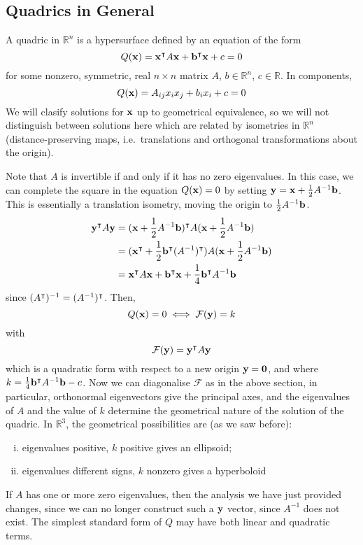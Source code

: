 \subsection{Quadrics in General}
A quadric in \(\mathbb R^n\) is a hypersurface defined by an equation of the form
\[
	Q(\vb x) = \vb x^\intercal A \vb x + \vb b^\intercal \vb x + c = 0
\]
for some nonzero, symmetric, real \(n \times n\) matrix \(A\), \(b \in \mathbb R^n\), \(c \in \mathbb R\).
In components,
\[
	Q(\vb x) = A_{ij}x_i x_j + b_i x_i + c = 0
\]
We will clasify solutions for \(\vb x\) up to geometrical equivalence, so we will not distinguish between solutions here which are related by isometries in \(\mathbb R^n\) (distance-preserving maps, i.e.\ translations and orthogonal transformations about the origin).

Note that \(A\) is invertible if and only if it has no zero eigenvalues.
In this case, we can complete the square in the equation \(Q(\vb x) = 0\) by setting \(\vb y = \vb x + \frac{1}{2}A^{-1} \vb b\).
This is essentially a translation isometry, moving the origin to \(\frac{1}{2}A^{-1} \vb b\).
\begin{align*}
	\vb y^\intercal A \vb y & = (\vb x + \frac{1}{2}A^{-1}\vb b)^\intercal A (\vb x + \frac{1}{2}A^{-1}\vb b)                         \\
	                         & = (\vb x^\intercal + \frac{1}{2}\vb b^\intercal(A^{-1})^\intercal) A (\vb x + \frac{1}{2}A^{-1}\vb b) \\
	                         & = \vb x^\intercal A \vb x + \vb b^\intercal \vb x + \frac{1}{4}\vb b^\intercal A^{-1}\vb b
\end{align*}
since \((A^\intercal)^{-1} = (A^{-1})^\intercal\).
Then,
\[
	Q(\vb x) = 0 \iff \mathcal F(\vb y) = k
\]
with
\[
	\mathcal F(\vb y) = \vb y^\intercal A \vb y
\]
which is a quadratic form with respect to a new origin \(\vb y = \vb 0\), and where \(k = \frac{1}{4}\vb b^\intercal A^{-1}\vb b - c\).
Now we can diagonalise \(\mathcal F\) as in the above section, in particular, orthonormal eigenvectors give the principal axes, and the eigenvalues of \(A\) and the value of \(k\) determine the geometrical nature of the solution of the quadric.
In \(\mathbb R^3\), the geometrical possibilities are (as we saw before):
\begin{enumerate}[(i)]
	\item eigenvalues positive, \(k\) positive gives an ellipsoid;
	\item eigenvalues different signs, \(k\) nonzero gives a hyperboloid
\end{enumerate}
If \(A\) has one or more zero eigenvalues, then the analysis we have just provided changes, since we can no longer construct such a \(\vb y\) vector, since \(A^{-1}\) does not exist.
The simplest standard form of \(Q\) may have both linear and quadratic terms.

